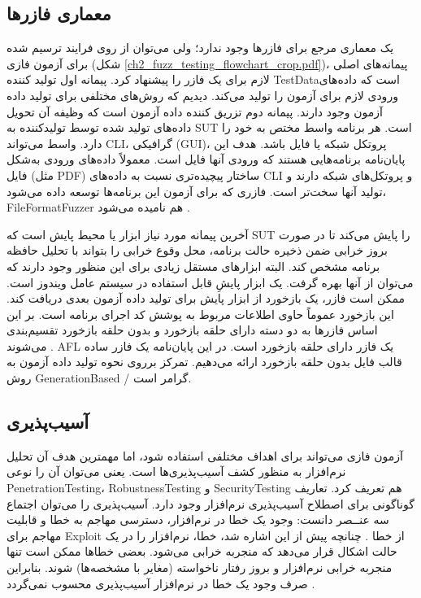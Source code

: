  \subsection{معماری فازرها}\label{sec:fuzzers_architechture}
 یک معماری مرجع برای فازرها وجود ندارد؛ ولی می‌توان از روی فرایند ترسیم شده برای آزمون فازی (شکل  \ref{ch2_fuzz_testing_flowchart_crop.pdf})، پیمانه‌های اصلی لازم برای یک فازر را پیشنهاد کرد. پیمانه اول تولید کننده \gls{TestData}است که داده‌های ورودی لازم برای آزمون را تولید می‌کند. دیدیم که روش‌های مختلفی برای تولید داده آزمون وجود دارند. پیمانه دوم تزریق کننده داده آزمون است که وظیفه آن تحویل داده‌های تولید شده توسط تولیدکننده به \gls{SUT} است. هر برنامه واسط مختص به خود را دارد. واسط می‌تواند \gls{CLI}، گرافیکی (\gls{GUI})، پروتکل شبکه یا فایل باشد. هدف این پایان‌نامه برنامه‌هایی هستند که ورودی آنها فایل است. معمولاً داده‌های ورودی به‌شکل فایل (مثل \gls{PDF}) ساختار پیچیده‌تری نسبت به داده‌های \gls{CLI} و پروتکل‌های شبکه دارند و تولید آنها سخت‌تر است. فازری که برای آزمون این برنامه‌ها توسعه داده می‌شود، \gls{FileFormatFuzzer} هم نامیده می‌شود \cite{Sutton:2007:FBF:1324770}.
 
 
 آخرین پیمانه مورد نیاز ابزار یا محیط پایش است که \gls{SUT} را پایش می‌کند تا در صورت بروز خرابی ضمن ذخیره حالت برنامه، محل وقوع خرابی را بتواند با تحلیل حافظه برنامه مشخص کند. البته ابزارهای مستقل زیادی برای این منظور وجود دارند که می‌توان از آنها بهره گرفت. 
 \cite{ApplicationVerifier}
 یک ابزار پایشِ قابل استفاده در سیستم عامل ویندوز است. ممکن است فازر، یک بازخورد از ابزار پایش برای تولید داده آزمون بعدی دریافت کند. این بازخورد عموماً حاوی اطلاعات مربوط به پوشش کد اجرای برنامه است. بر این اساس فازرها به دو دسته دارای حلقه بازخورد و بدون حلقه بازخورد تقسیم‌بندی می‌شوند \cite{Chen2018}.
 AFL\cite{Zalewsky2013}
 یک فازر دارای حلقه بازخورد است. در این پایان‌نامه یک فازر ساده قالب فایل بدون حلقه بازخورد ارائه می‌دهیم. تمرکز برروی نحوه تولید داده آزمون به روش \gls{GenerationBased} / گرامر است.
 
 
 
 \subsection{آسیب‌پذیری}
 آزمون فازی می‌تواند برای اهداف مختلفی استفاده شود، اما مهمترین هدف آن تحلیل نرم‌افزار به منظور کشف آسیب‌پذیری‌ها است. یعنی می‌توان آن را نوعی \gls{PenetrationTesting}، \gls{RobustnessTesting} و \gls{SecurityTesting} هم تعریف کرد. تعاریف گوناگونی برای اصطلاح آسیب‌پذیری نرم‌افزار وجود دارد. آسیب‌پذیری را می‌توان اجتماع سه عنــصر دانست: وجود یک خطا در نرم‌افزار، دسترسی مهاجم به خطا و قابلیت مهاجم برای \gls{Exploit} از خطا \cite{Chen2018,InternetSecurityGlossary}. چنانچه پیش از این اشاره شد، خطا، نرم‌افزار را در یک حالت اشکال قرار می‌دهد که منجربه خرابی می‌شود. بعضی خطاها ممکن است تنها منجربه خرابی نرم‌افزار و بروز رفتار ناخواسته (مغایر با مشخصه‌ها) شوند. بنابراین صرف وجود یک خطا در نرم‌افزار آسیب‌پذیری محسوب نمی‌گردد 
 \cite{Sutton:2007:FBF:1324770,Rathaus:2007:OSF:1536880}.
 
